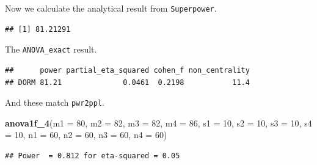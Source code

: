 \documentclass[]{book}
\newenvironment{Shaded}{\begin{snugshade}}{\end{snugshade}}
\newcommand{\DataTypeTok}[1]{\textcolor[rgb]{0.13,0.29,0.53}{#1}}
\newcommand{\DecValTok}[1]{\textcolor[rgb]{0.00,0.00,0.81}{#1}}
\newcommand{\KeywordTok}[1]{\textcolor[rgb]{0.13,0.29,0.53}{\textbf{#1}}}
\newcommand{\NormalTok}[1]{#1}
\newcommand{\OperatorTok}[1]{\textcolor[rgb]{0.81,0.36,0.00}{\textbf{#1}}}
\newcommand{\OtherTok}[1]{\textcolor[rgb]{0.56,0.35,0.01}{#1}}
\newcommand{\StringTok}[1]{\textcolor[rgb]{0.31,0.60,0.02}{#1}}
\begin{document}
Now we calculate the analytical result from \texttt{Superpower}.

\begin{Shaded}
\end{Shaded}

\begin{verbatim}
## [1] 81.21291
\end{verbatim}

The \texttt{ANOVA\_exact} result.

\begin{Shaded}
\end{Shaded}

\begin{verbatim}
##      power partial_eta_squared cohen_f non_centrality
## DORM 81.21              0.0461  0.2198           11.4
\end{verbatim}

And these match \texttt{pwr2ppl}.

\begin{Shaded}
\begin{Highlighting}[]
\KeywordTok{anova1f_4}\NormalTok{(}\DataTypeTok{m1 =} \DecValTok{80}\NormalTok{, }\DataTypeTok{m2 =} \DecValTok{82}\NormalTok{, }\DataTypeTok{m3 =} \DecValTok{82}\NormalTok{, }\DataTypeTok{m4 =} \DecValTok{86}\NormalTok{,}
          \DataTypeTok{s1 =} \DecValTok{10}\NormalTok{, }\DataTypeTok{s2 =} \DecValTok{10}\NormalTok{, }\DataTypeTok{s3 =} \DecValTok{10}\NormalTok{, }\DataTypeTok{s4 =} \DecValTok{10}\NormalTok{,}
          \DataTypeTok{n1 =} \DecValTok{60}\NormalTok{, }\DataTypeTok{n2 =} \DecValTok{60}\NormalTok{, }\DataTypeTok{n3 =} \DecValTok{60}\NormalTok{, }\DataTypeTok{n4 =} \DecValTok{60}\NormalTok{)}
\end{Highlighting}
\end{Shaded}

\begin{verbatim}
## Power  = 0.812 for eta-squared = 0.05
\end{verbatim}
\end{document}

